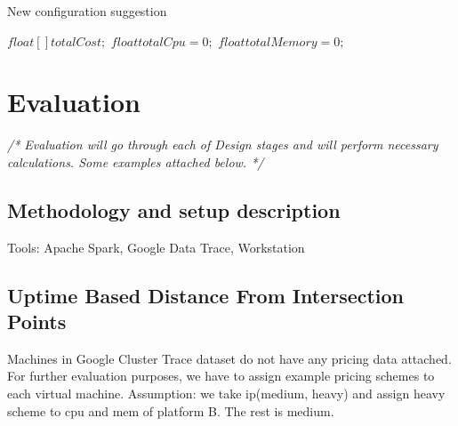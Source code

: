 \documentclass[]{final_report}
\begin{document}
\begin{algorithm}[h]
\caption{New configuration suggestion}
\label{alg:new_configuration}
 \algrenewcommand{}
 \algrenewcommand{}

  $float[ ] totalCost;$
  $float totalCpu = 0;$
  $float totalMemory = 0;$




\end{algorithm}




\chapter{Evaluation}

\emph{/* Evaluation will go through each of Design stages and will perform necessary calculations. Some examples attached below. */}


\section{Methodology and setup description}
Tools:
Apache Spark, Google Data Trace, Workstation


\section{Uptime Based Distance From Intersection Points}

Machines in Google Cluster Trace dataset do not have any pricing data attached. For further evaluation purposes, we have to assign example pricing schemes to each virtual machine. 
Assumption: we take ip(medium, heavy) and assign heavy scheme to cpu and mem of platform B. The rest is medium.
\end{document}
